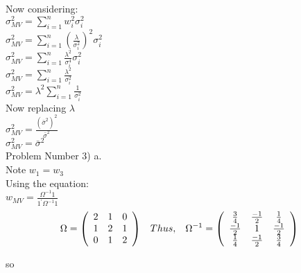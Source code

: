 \documentclass[11pt]{article}
\begin{document}
Now considering:\\
$\sigma_{MV}^{2} = \sum_{i=1}^{n}w_{i}^{2}\sigma_{i}^{2}$\\
$\sigma_{MV}^{2} = \sum_{i=1}^{n} (\frac{\lambda}{\sigma_{i}^{2}})^{2}\sigma_{i}^{2}$\\
$\sigma_{MV}^{2} = \sum_{i=1}^{n}\frac{\lambda^{2}}{\sigma_{i}^{4}}\sigma_{i}^{2}$\\
$\sigma_{MV}^{2} = \sum_{i=1}^{n}\frac{\lambda^{2}}{\sigma_{i}^{2}}$\\
$\sigma_{MV}^{2} = \lambda^{2} \sum_{i=1}^{n}\frac{1}{\sigma_{i}^{2}}$\\

Now replacing $\lambda$\\
$\sigma_{MV}^{2} = \frac{(\bar{\sigma}^{2})^{2}}{\bar{\sigma}^{2}}$\\
$\sigma_{MV}^{2} = \bar{\sigma}^{2}$\\




Problem Number 3) a.\\

Note $w_{1} = w_{3}$\\
Using the equation:\\
$w_{MV} = \frac{\Omega^{-1} 1}{1^{'} \Omega^{-1} 1}$\\

\[
\Omega = \left( \begin{array}{ccc}
2 & 1 & 0 \\
1 & 2 & 1 \\
0 & 1 & 2 \end{array} \right)
\\
\hspace{3mm} Thus, \hspace{3mm}
\Omega^{-1} = \left( \begin{array}{ccc}
\frac{3}{4} & \frac{-1}{2} & \frac{1}{4} \\
\frac{-1}{2} & 1 & \frac{-1}{2} \\
\frac{1}{4} & \frac{-1}{2} & \frac{3}{4} \end{array} \right)
\\
\]

so\\
\end{document}
